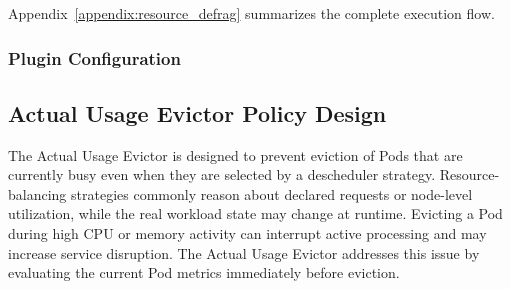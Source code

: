 Appendix~\ref{appendix:resource_defrag} summarizes the complete execution flow.

\subsubsection{Plugin Configuration}
\label{sec:resource_defrag_config}

\begin{table}[tbp]
    \centering
    \caption{ResourceDefragmentation Plugin Arguments}
    \label{tab:resource_defrag_args}
    \renewcommand{\arraystretch}{1.25}
\end{table}

\begin{figure}[tbp]
    \centering
    \begin{minipage}{0.95\textwidth}
    
    \end{minipage}
\end{figure}

\subsection{Actual Usage Evictor Policy Design}
\label{sec:actualusage_policydesign}
The Actual Usage Evictor is designed to prevent eviction of Pods that are currently busy even when they are selected by a descheduler strategy. Resource-balancing strategies commonly reason about declared requests or node-level utilization, while the real workload state may change at runtime. Evicting a Pod during high CPU or memory activity can interrupt active processing and may increase service disruption. The Actual Usage Evictor addresses this issue by evaluating the current Pod metrics immediately before eviction.

